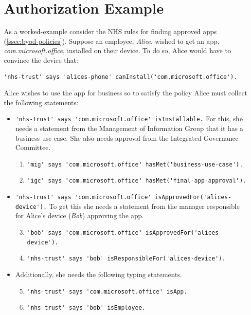 \documentclass{llncs}
\begin{document}
\section{Authorization Example}

As a worked-example consider the NHS rules for finding approved apps (\autoref{ssec:byod-policies}).
Suppose an employee, \emph{Alice}, wished to get an app, \emph{\ttfamily com.microsoft.office}, installed on their device.
To do so, Alice would have to convince the device that:

\begin{lstlisting}[frame=none]
'nhs-trust' says 'alices-phone' canInstall('com.microsoft.office').
\end{lstlisting}

Alice wishes to use the app for business so to satisfy the policy Alice must collect the following statements:
\begin{itemize}
    \newcommand{\weitemsize}[0]{\footnotesize}
  \item {\weitemsize \lstinline{'nhs-trust' says 'com.microsoft.office' isInstallable.}\newline}
    For this, she needs a statement from the Management of Information Group that it has a business use-case.
    She also needs approval from the Integrated Governance Committee.
    \begin{enumerate}\setcounter{enumi}{0}
      \item {\weitemsize \lstinline{'mig' says 'com.microsoft.office' hasMet('business-use-case').}}
      \item {\weitemsize \lstinline{'igc' says 'com.microsoft.office' hasMet('final-app-approval').}}
    \end{enumerate}
  \item {\weitemsize \lstinline{'nhs-trust' says 'com.microsoft.office' isApprovedFor('alices-device').}}
    To get this she needs a statement from the manager responsible for Alice's device (\emph{Bob}) approving the app.
    \begin{enumerate}\setcounter{enumi}{2}
      \item {\weitemsize \lstinline{'bob' says 'com.microsoft.office' isApprovedFor('alices-device').}}
      \item {\weitemsize \lstinline{'nhs-trust' says 'bob' isResponsibleFor('alices-device').}}
    \end{enumerate}
  \item Additionally, she needs the following typing statements.
    \begin{enumerate}\setcounter{enumi}{4}
      \item {\weitemsize \lstinline{'nhs-trust' says 'com.microsoft.office' isApp.}} \label{item:isapp}
      \item {\weitemsize \lstinline{'nhs-trust' says 'bob' isEmployee.}}
    \end{enumerate}
\end{itemize}
\end{document}

